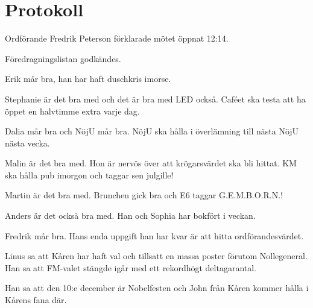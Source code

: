 \documentclass[10pt]{article}
\def\mo{Fredrik Peterson}
\begin{document}
\section*{Protokoll}
\begin{paragrafer}
Ordförande {\mo} förklarade mötet öppnat 12:14.

{\valavmo}

{\valavms}

{\tosg}

{\ingaadj}

{\valavj}

Föredragningslistan godkändes.


\begin{fyllnadsval} %
\end{fyllnadsval}

\begin{paragrafer}
Erik mår bra, han har haft duschkris imorse.

Stephanie är det bra med och det är bra med LED också. Caféet ska testa att ha öppet en halvtimme extra varje dag.

Dalia mår bra och NöjU mår bra. NöjU ska hålla i överlämning till nästa NöjU nästa vecka.

Malin är det bra med. Hon är nervös över att krögarsvärdet ska bli hittat. KM ska hålla pub imorgon och taggar sen julgille!

Martin är det bra med. Brunchen gick bra och E6 taggar G.E.M.B.O.R.N.!

Anders är det också bra med. Han och Sophia har bokfört i veckan.

Fredrik mår bra. Hans enda uppgift han har kvar är att hitta ordförandesvärdet.

Linus sa att Kåren har haft val och tillsatt en massa poster förutom Nollegeneral. Han sa att FM-valet stängde igår med ett rekordhögt deltagarantal.

Han sa att den 10:e december är Nobelfesten och John från Kåren kommer hålla i Kårens fana där.


\end{paragrafer}
\end{paragrafer}
\end{document}
